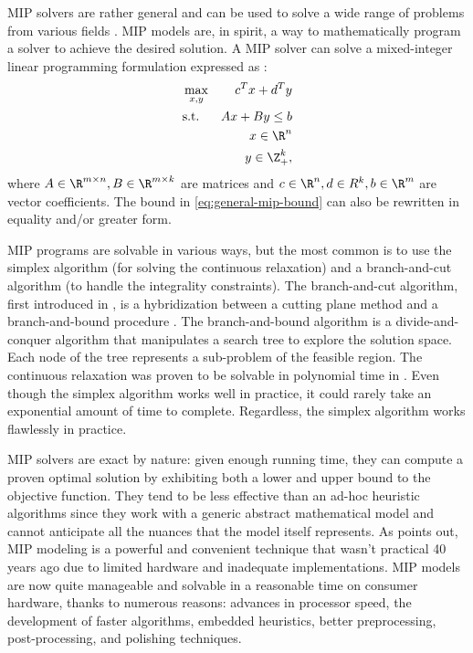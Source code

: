 MIP solvers are rather general and can be used to solve a wide range of problems from various fields \parencite{bixby2007progress}.
MIP models are, in spirit, a way to mathematically program a solver to achieve the desired solution.
A MIP solver can solve a mixed-integer linear programming formulation
expressed as \parencite{wolsey1999integer}:
\begin{align}
	 & \max_{x, y} & c^T x + d^T y                                 \\
	 & \text{s.t.} & A x + B y \le b  \label{eq:general-mip-bound} \\
	 &             & x \in \R^n                                    \\
	 &             & y \in \Z_{+}^k,
\end{align}
where $A \in \R^{m \times n}, B \in \R^{m \times k}$ are matrices and
$c \in \R^n, d \in R^k, b \in \R^m$ are vector coefficients.
The bound in \cref{eq:general-mip-bound} can also be rewritten in equality and/or greater form.

MIP programs are solvable in various ways,
but the most common is to use the simplex algorithm (for solving the continuous relaxation)
and a branch-and-cut algorithm (to handle the integrality constraints).
The branch-and-cut algorithm,
first introduced in \textcite{padberg1991},
is a hybridization between a cutting plane method
and a branch-and-bound procedure \parencite{land2010}.
The branch-and-bound algorithm is a divide-and-conquer algorithm
that manipulates a search tree to explore the solution space.
Each node of the tree represents a sub-problem of the feasible region.
The continuous relaxation was proven to be solvable in polynomial time in \textcite {khachiyan1979polynomial}.
Even though the simplex algorithm works well in practice,
it could rarely take an exponential amount of time to complete.
Regardless, the simplex algorithm works flawlessly in practice.

MIP solvers are exact by nature: given enough running time,
they can compute a proven optimal solution by exhibiting both a lower and upper bound
to the objective function.
They tend to be less effective than an ad-hoc heuristic algorithms
since they work with a generic abstract mathematical model
and cannot anticipate all the nuances that the model itself represents.
As \textcite{bixby1999} points out,
MIP modeling is a powerful and convenient technique that wasn't practical 40 years ago due
to limited hardware and inadequate implementations.
MIP models are now quite manageable and solvable in a reasonable time on consumer hardware,
thanks to numerous reasons:
advances in processor speed, the development of faster algorithms,
embedded heuristics, better preprocessing, post-processing, and polishing techniques.


